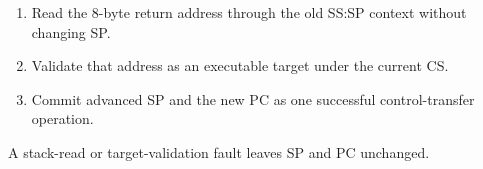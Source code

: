 \begin{enumerate}
\item Read the 8-byte return address through the old SS:SP context without changing SP.
\item Validate that address as an executable target under the current CS.
\item Commit advanced SP and the new PC as one successful control-transfer operation.
\end{enumerate}

A stack-read or target-validation fault leaves SP and PC unchanged.
